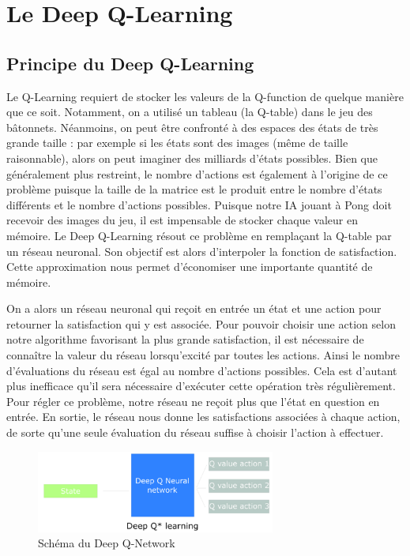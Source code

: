 \section{Le Deep Q-Learning}

\subsection{Principe du Deep Q-Learning}

Le Q-Learning requiert de stocker les valeurs de la Q-function de quelque manière que ce soit. Notamment, on a utilisé un tableau (la Q-table) dans le jeu des
bâtonnets. Néanmoins, on peut être confronté à des espaces des états de très grande taille : par exemple si les états sont des images (même de taille raisonnable), 
alors on peut imaginer des milliards d'états possibles. Bien que généralement plus restreint, le nombre d'actions est également à l'origine de ce problème puisque la
taille de la matrice est le produit entre le nombre d'états différents et le nombre d'actions possibles. Puisque notre IA jouant à Pong doit recevoir des images du jeu,
il est impensable de stocker chaque valeur en mémoire. Le Deep Q-Learning résout ce problème en remplaçant la Q-table par un réseau neuronal. Son objectif est alors 
d'interpoler la fonction de satisfaction. Cette approximation nous permet d'économiser une importante quantité de mémoire.

On a alors un réseau neuronal qui reçoit en entrée un état et une action pour retourner la satisfaction qui y est associée. Pour pouvoir choisir une action selon
notre algorithme favorisant la plus grande satisfaction, il est nécessaire de connaître la valeur du réseau lorsqu'excité par toutes les actions. Ainsi
le nombre d'évaluations du réseau est égal au nombre d'actions possibles. Cela est d'autant plus inefficace qu'il sera nécessaire d'exécuter cette opération très
régulièrement. Pour régler ce problème, notre réseau ne reçoit plus que l'état en question en entrée. En sortie, le réseau nous donne les satisfactions associées à chaque 
action, de sorte qu'une seule évaluation du réseau suffise à choisir l'action à effectuer.

\begin{figure}[h]
 \centering
 \includegraphics[width=0.7\textwidth]{img/schema_dql.png}
 \caption{Schéma du Deep Q-Network}
\end{figure}


